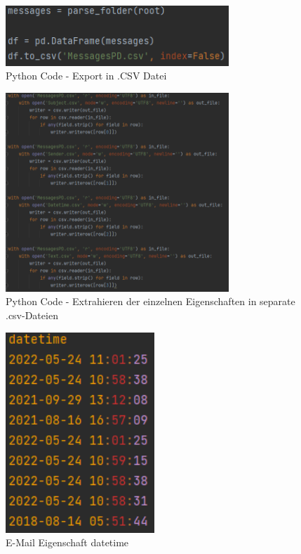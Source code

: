 \appendix
\part*{\appendixname}

\begin{figure}[!ht]
    \centering
    \includegraphics[width=0.75\textwidth]{images/Dataframe_messages.PNG}
    \caption{Python Code - Export in .CSV Datei} 
    \label{fig:dataframeparstetocsv}
\end{figure}

\begin{figure}[!ht]
    \centering
    \includegraphics[width=0.75\textwidth]{images/Einzelne_Eigenschaften_in_CSV.PNG}
    \caption{Python Code - Extrahieren der einzelnen Eigenschaften in separate .csv-Dateien} 
    \label{fig:csvseparation}
\end{figure}

\begin{figure}[!ht]
    \centering
    \includegraphics[width=0.50\textwidth]{images/datetime.PNG}
    \caption{E-Mail Eigenschaft datetime} 
    \label{fig:datetime}
\end{figure}

